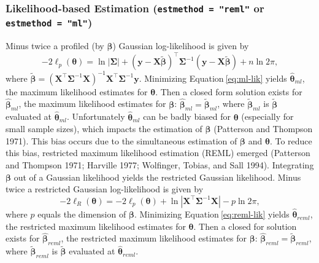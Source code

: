 \documentclass{article}
\begin{document}
\hypertarget{likelihood-based-estimation-estmethod-reml-or-estmethod-ml}{%
\subsubsection{\texorpdfstring{Likelihood-based Estimation
(\texttt{estmethod\ =\ "reml"} or
\texttt{estmethod\ =\ "ml"})}{Likelihood-based Estimation (estmethod = "reml" or estmethod = "ml")}}\label{likelihood-based-estimation-estmethod-reml-or-estmethod-ml}}

Minus twice a profiled (by \(\boldsymbol{\beta}\)) Gaussian
log-likelihood is given by \begin{equation}\label{eq:ml-lik}
  -2\ell_p(\boldsymbol{\theta}) = \ln{|\boldsymbol{\Sigma}|} + (\mathbf{y} - \mathbf{X} \tilde{\boldsymbol{\beta}})^\top \boldsymbol{\Sigma}^{-1} (\mathbf{y} - \mathbf{X} \tilde{\boldsymbol{\beta}}) + n \ln{2\pi},
\end{equation} where
\(\tilde{\boldsymbol{\beta}} = (\mathbf{X}^\top \mathbf{\Sigma}^{-1} \mathbf{X})^{-1} \mathbf{X}^\top \mathbf{\Sigma}^{-1} \mathbf{y}\).
Minimizing Equation\(~\)\ref{eq:ml-lik} yields
\(\boldsymbol{\hat{\theta}}_{ml}\), the maximum likelihood estimates for
\(\boldsymbol{\theta}\). Then a closed form solution exists for
\(\boldsymbol{\hat{\beta}}_{ml}\), the maximum likelihood estimates for
\(\boldsymbol{\beta}\):
\(\boldsymbol{\hat{\beta}}_{ml} = \tilde{\boldsymbol{\beta}}_{ml}\),
where \(\tilde{\boldsymbol{\beta}}_{ml}\) is
\(\tilde{\boldsymbol{\beta}}\) evaluated at
\(\boldsymbol{\hat{\theta}}_{ml}\). Unfortunately
\(\boldsymbol{\hat{\theta}}_{ml}\) can be badly biased for
\(\boldsymbol{\theta}\) (especially for small sample sizes), which
impacts the estimation of \(\boldsymbol{\beta}\) (Patterson and Thompson
1971). This bias occurs due to the simultaneous estimation of
\(\boldsymbol{\beta}\) and \(\boldsymbol{\theta}\). To reduce this bias,
restricted maximum likelihood estimation (REML) emerged (Patterson and
Thompson 1971; Harville 1977; Wolfinger, Tobias, and Sall 1994).
Integrating \(\boldsymbol{\beta}\) out of a Gaussian likelihood yields
the restricted Gaussian likelihood. Minus twice a restricted Gaussian
log-likelihood is given by \begin{equation}\label{eq:reml-lik}
  -2\ell_R(\boldsymbol{\theta}) = -2\ell_p(\boldsymbol{\theta})  + \ln{|\mathbf{X}^\top \boldsymbol{\Sigma}^{-1} \mathbf{X}|} - p \ln{2\pi} ,
\end{equation} where \(p\) equals the dimension of
\(\boldsymbol{\beta}\). Minimizing Equation\(~\)\ref{eq:reml-lik} yields
\(\boldsymbol{\hat{\theta}}_{reml}\), the restricted maximum likelihood
estimates for \(\boldsymbol{\theta}\). Then a closed for solution exists
for \(\boldsymbol{\hat{\beta}}_{reml}\), the restricted maximum
likelihood estimates for \(\boldsymbol{\beta}\):
\(\boldsymbol{\hat{\beta}}_{reml} = \tilde{\boldsymbol{\beta}}_{reml}\),
where \(\tilde{\boldsymbol{\beta}}_{reml}\) is
\(\tilde{\boldsymbol{\beta}}\) evaluated at
\(\boldsymbol{\hat{\theta}}_{reml}\).
\end{document}
